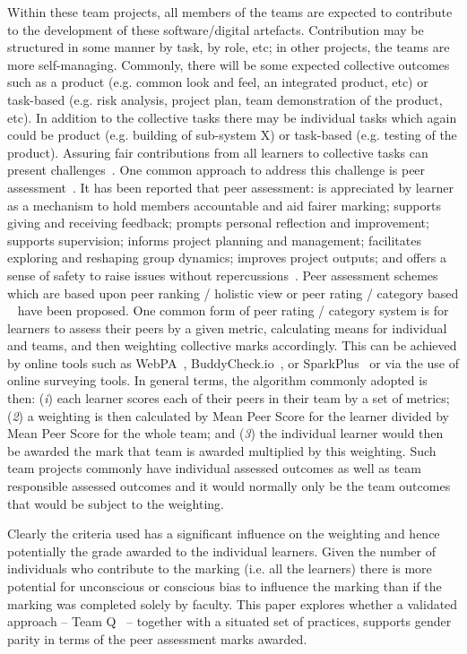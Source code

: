 \documentclass[sigconf, anonymous=false]{acmart}
\begin{document}
Within these team projects, all members of the teams are expected to
contribute to the development of these software/digital
artefacts. Contribution may be structured in some manner by
task, by role, etc; in other projects, the teams are more
self-managing. Commonly, there will be some expected collective
outcomes such as a product (e.g. common look and
feel, an integrated product, etc) or task-based (e.g. risk analysis,
project plan, team demonstration of the product, etc).  In addition to
the collective tasks there may be individual tasks which again could
be product (e.g. building of sub-system X) or task-based (e.g. testing
of the product). Assuring fair contributions from all learners to
collective tasks can present challenges~\cite{Philips21}. One common
approach to address this challenge is peer
assessment~\cite{Gordon2010}. It has been reported that peer assessment: is appreciated by learner as a mechanism to hold members
accountable and aid fairer marking; supports giving and
receiving feedback; prompts personal reflection and improvement;
supports supervision; informs project planning and management;
facilitates exploring and reshaping group dynamics; improves project
outputs; and offers a sense of safety to raise issues without
repercussions~\cite{Mitchell2021}. Peer assessment schemes which are
based upon peer ranking / holistic view or peer rating / category based ~\cite{Yanbin2005, Lejk2001} have
been proposed. One common form of peer rating / category system is for learners
to assess their peers by a given metric, calculating means for
individual and teams, and then weighting collective marks
accordingly. This can be achieved by online tools such as
WebPA~\cite{WebPA}, BuddyCheck.io~\cite{BuddyCheck}, or
SparkPlus~\cite{SparkPlus} or via the use of online surveying
tools. In general terms, the algorithm commonly adopted is then:
({\emph{i}}) each learner scores each of their peers in their team by
a set of metrics; ({\emph{2}}) a weighting is then calculated by Mean
Peer Score for the learner divided by Mean Peer Score for the whole
team; and ({\emph{3}}) the individual learner would then be awarded
the mark that team is awarded multiplied by this weighting. Such team
projects commonly have individual assessed outcomes as well as team
responsible assessed outcomes and it would normally only be the team
outcomes that would be subject to the weighting.

Clearly the criteria used has a significant influence on the weighting
and hence potentially the grade awarded to the individual
learners. Given the number of individuals who contribute to the
marking (i.e. all the learners) there is more potential for
unconscious or conscious bias to influence the marking than if the
marking was completed solely by faculty. This paper explores whether a
validated approach -- Team Q~\cite{Britton2017} -- together with a
situated set of practices, supports gender parity in terms of the peer
assessment marks awarded.
\end{document}
